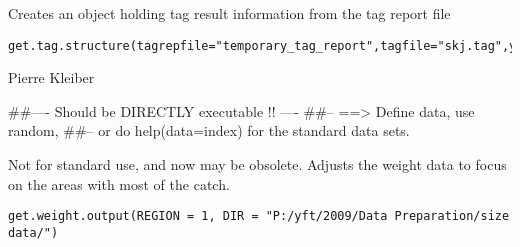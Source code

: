 \documentclass[a4paper]{book}
\begin{document}
%
\begin{Description}\relax

Creates an object holding tag result information from the tag report file 
\end{Description}
%
\begin{Usage}
\begin{verbatim}
get.tag.structure(tagrepfile="temporary_tag_report",tagfile="skj.tag",year1=1972)
\end{verbatim}
\end{Usage}
%
\begin{Arguments}
\begin{ldescription}
\item[\code{tagrepfile}] 


\item[\code{tagfile}] 


\item[\code{year1}] 


\end{ldescription}
\end{Arguments}
%
\begin{Author}\relax
Pierre Kleiber

\end{Author}
%
\begin{Examples}
\begin{ExampleCode}
##---- Should be DIRECTLY executable !! ----
##-- ==>  Define data, use random,
##--	or do  help(data=index)  for the standard data sets.

\end{ExampleCode}
\end{Examples}
%
\begin{Description}\relax

Not for standard use, and now may be obsolete. Adjusts the weight data to focus on the areas with most of the catch.
\end{Description}
%
\begin{Usage}
\begin{verbatim}
get.weight.output(REGION = 1, DIR = "P:/yft/2009/Data Preparation/size data/")
\end{verbatim}
\end{Usage}
%
\begin{Arguments}
\begin{ldescription}
\item[\code{REGION}] 


\item[\code{DIR}] 


\end{ldescription}
\end{Arguments}
\end{document}
